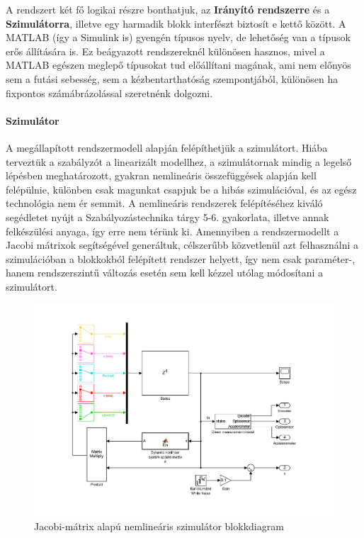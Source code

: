 A rendszert két fő logikai részre bonthatjuk, az \textbf{Irányító rendszerre} és a \textbf{Szimulátorra}, illetve egy harmadik blokk interfészt biztosít e kettő között. A MATLAB (így a Simulink is) gyengén típusos nyelv, de lehetőség van a típusok erős állítására is. Ez beágyazott rendszereknél különösen hasznos, mivel a MATLAB egészen meglepő típusokat tud előállítani magának, ami nem előnyös sem a futási sebesség, sem a kézbentarthatóság szempontjából, különösen ha fixpontos számábrázolással szeretnénk dolgozni.

\paragraph{Szimulátor}

A megállapított rendszermodell alapján felépíthetjük a szimulátort. Hiába terveztük a szabályzót a linearizált modellhez, a szimulátornak mindig a legelső lépésben meghatározott, gyakran nemlineáris összefüggések alapján kell felépülnie, különben csak magunkat csapjuk be a hibás szimulációval, és az egész technológia nem ér semmit.
A nemlineáris rendszerek felépítéséhez kiváló segédletet nyújt a Szabályozástechnika tárgy 5-6. gyakorlata, illetve annak felkészülési anyaga\cite[p.~319-354]{szabtech}, így erre nem térünk ki. Amennyiben a rendszermodellt a Jacobi mátrixok segítségével generáltuk, célszerűbb közvetlenül azt felhasználni a szimulációban a blokkokból felépített rendszer helyett, így nem csak paraméter-, hanem rendszerszintű változás esetén sem kell kézzel utólag módosítani a szimulátort.

\begin{figure}[!ht]
    \centering
    \includegraphics[width=\linewidth]{img/sys}
    \centering
    \vspace{-30pt}
    \caption{Jacobi-mátrix alapú nemlineáris szimulátor blokkdiagram}
    \label{fig:model}
\end{figure}

